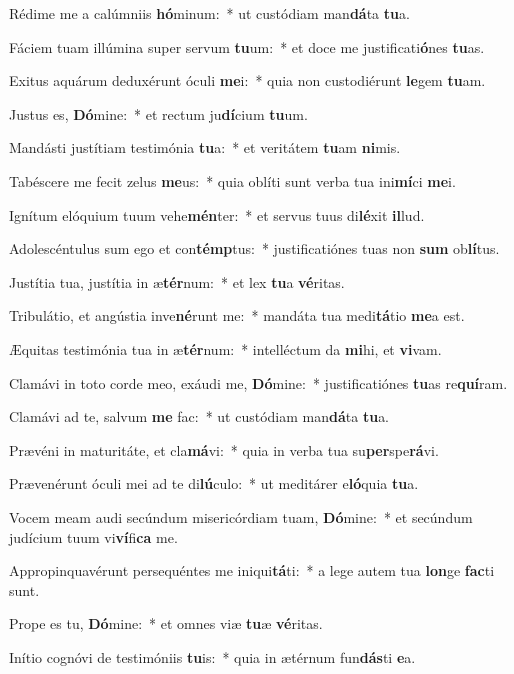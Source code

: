 \item Rédime me a calúmniis \textbf{hó}minum:~* ut custódiam man\textbf{dá}ta \textbf{tu}a.
\item Fáciem tuam illúmina super servum \textbf{tu}um:~* et doce me justificati\textbf{ó}nes \textbf{tu}as.
\item Exitus aquárum deduxérunt óculi \textbf{me}i:~* quia non custodiérunt \textbf{le}gem \textbf{tu}am.
\item Justus es, \textbf{Dó}mine:~* et rectum ju\textbf{dí}cium \textbf{tu}um.
\item Mandásti justítiam testimónia \textbf{tu}a:~* et veritátem \textbf{tu}am \textbf{ni}mis.
\item Tabéscere me fecit zelus \textbf{me}us:~* quia oblíti sunt verba tua ini\textbf{mí}ci \textbf{me}i.
\item Ignítum elóquium tuum vehe\textbf{mén}ter:~* et servus tuus di\textbf{lé}xit \textbf{il}lud.
\item Adolescéntulus sum ego et con\textbf{témp}tus:~* justificatiónes tuas non \textbf{sum} ob\textbf{lí}tus.
\item Justítia tua, justítia in æ\textbf{tér}num:~* et lex \textbf{tu}a \textbf{vé}ritas.
\item Tribulátio, et angústia inve\textbf{né}runt me:~* mandáta tua medi\textbf{tá}tio \textbf{me}a est.
\item Æquitas testimónia tua in æ\textbf{tér}num:~* intelléctum da \textbf{mi}hi, et \textbf{vi}vam.
\item Clamávi in toto corde meo, exáudi me, \textbf{Dó}mine:~* justificatiónes \textbf{tu}as re\textbf{quí}ram.
\item Clamávi ad te, salvum \textbf{me} fac:~* ut custódiam man\textbf{dá}ta \textbf{tu}a.
\item Prævéni in maturitáte, et cla\textbf{má}vi:~* quia in verba tua su\textbf{per}spe\textbf{rá}vi.
\item Prævenérunt óculi mei ad te di\textbf{lú}culo:~* ut meditárer e\textbf{ló}quia \textbf{tu}a.
\item Vocem meam audi secúndum misericórdiam tuam, \textbf{Dó}mine:~* et secúndum judícium tuum vi\textbf{ví}fi\textbf{ca} me.
\item Appropinquavérunt persequéntes me iniqui\textbf{tá}ti:~* a lege autem tua \textbf{lon}ge \textbf{fac}ti sunt.
\item Prope es tu, \textbf{Dó}mine:~* et omnes viæ \textbf{tu}æ \textbf{vé}ritas.
\item Inítio cognóvi de testimóniis \textbf{tu}is:~* quia in ætérnum fun\textbf{dás}ti \textbf{e}a.
